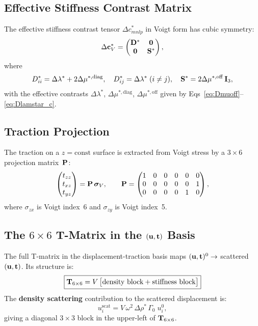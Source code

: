 \subsection{Effective Stiffness Contrast Matrix}

The effective stiffness contrast tensor $\Delta c^*_{mnlp}$ in Voigt form
has cubic symmetry:
\begin{equation}
  \Delta\mathbf{c}^*_V
  = \begin{pmatrix} \mathbf{D}^* & \mathbf{0} \\
                     \mathbf{0} & \mathbf{S}^* \end{pmatrix},
\end{equation}
where
\begin{equation}
  D^*_{ii} = \Delta\lambda^* + 2\Delta\mu^{*,\mathrm{diag}}, \quad
  D^*_{ij} = \Delta\lambda^* \; (i \neq j), \quad
  \mathbf{S}^* = 2\Delta\mu^{*,\mathrm{off}}\,\mathbf{I}_3,
\end{equation}
with the effective contrasts $\Delta\lambda^*$,
$\Delta\mu^{*,\mathrm{diag}}$, $\Delta\mu^{*,\mathrm{off}}$ given by
Eqs~\eqref{eq:Dmuoff}--\eqref{eq:Dlamstar_c}.

\subsection{Traction Projection}

The traction on a $z = \text{const}$ surface is extracted from Voigt stress
by a $3\times 6$ projection matrix~$\mathbf{P}$:
\begin{equation}
  \begin{pmatrix} t_{zz} \\ t_{xz} \\ t_{yz} \end{pmatrix}
  = \mathbf{P}\,\boldsymbol{\sigma}_V, \qquad
  \mathbf{P}
  = \begin{pmatrix}
    1 & 0 & 0 & 0 & 0 & 0 \\
    0 & 0 & 0 & 0 & 0 & 1 \\
    0 & 0 & 0 & 0 & 1 & 0
  \end{pmatrix},
\end{equation}
where $\sigma_{zx}$ is Voigt index~6 and $\sigma_{zy}$ is Voigt index~5.

\subsection{The $6\times 6$ T-Matrix in the $(\mathbf{u},\mathbf{t})$ Basis}

The full T-matrix in the displacement-traction basis maps
$(\mathbf{u},\mathbf{t})^0 \to$ scattered $(\mathbf{u},\mathbf{t})$.  Its
structure is:
\begin{equation}
  \boxed{%
    \bT_{6\times 6}
    = V\,\bigl[\text{density block} + \text{stiffness block}\bigr]
  }
\end{equation}
The \textbf{density scattering} contribution to the scattered displacement
is:
\begin{equation}
  u_i^{\mathrm{scat}}
  = V\,\omega^2\,\Delta\rho^*\,\Gamma_0\;u_i^0,
\end{equation}
giving a diagonal $3\times 3$ block in the upper-left of
$\mathbf{T}_{6\times 6}$.

